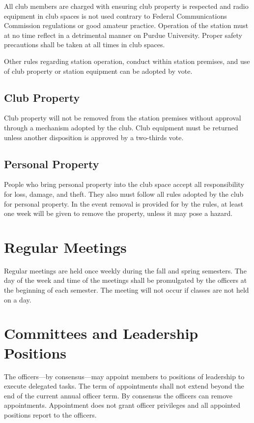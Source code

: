 \documentclass{article}
\begin{document}
All club members are charged with ensuring club property is respected and radio
equipment in club spaces is not used contrary to Federal Communications
Commission regulations or good amateur practice. Operation of the station must
at no time reflect in a detrimental manner on Purdue University. Proper safety
precautions shall be taken at all times in club spaces.

Other rules regarding station operation, conduct within station premises, and
use of club property or station equipment can be adopted by vote.

\subsection{Club Property}

Club property will not be removed from the station premises without approval
through a mechanism adopted by the club. Club equipment must be returned unless
another disposition is approved by a two-thirds vote.

\subsection{Personal Property}

People who bring personal property into the club space accept all responsibility
for loss, damage, and theft. They also must follow all rules adopted by the club
for personal property. In the event removal is provided for by the rules, at
least one week will be given to remove the property, unless it may pose a
hazard.

\section{Regular Meetings}

Regular meetings are held once weekly during the fall and spring semesters. The
day of the week and time of the meetings shall be promulgated by the officers at
the beginning of each semester. The meeting will not occur if classes are not
held on a day.

\section{Committees and Leadership Positions}

The officers---by consensus---may appoint members to positions of leadership to
execute delegated tasks. The term of appointments shall not extend beyond the
end of the current annual officer term. By consensus the officers can remove
appointments. Appointment does not grant officer privileges and all appointed
positions report to the officers.
\end{document}
